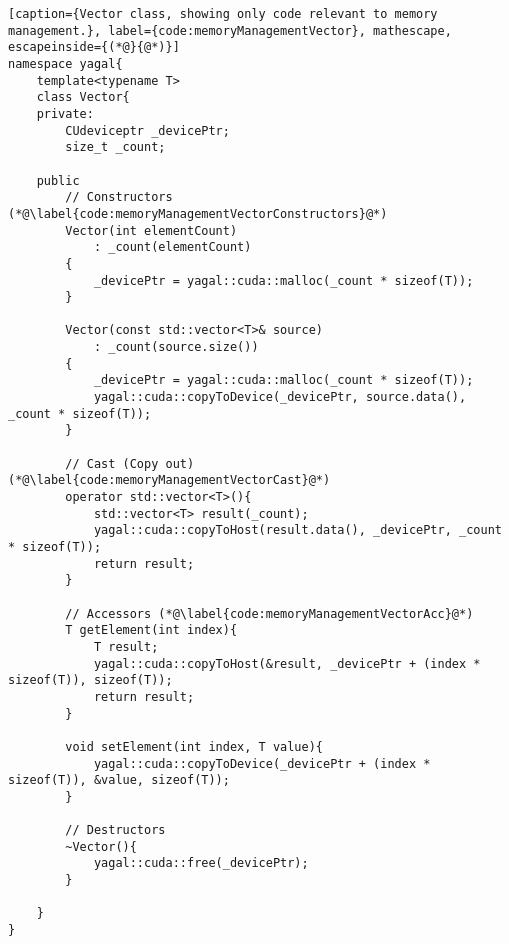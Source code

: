 

\begin{lstlisting}[caption={Vector class, showing only code relevant to memory management.}, label={code:memoryManagementVector}, mathescape, escapeinside={(*@}{@*)}]
namespace yagal{
    template<typename T>
    class Vector{
    private:
        CUdeviceptr _devicePtr;
        size_t _count;

    public
        // Constructors (*@\label{code:memoryManagementVectorConstructors}@*)
        Vector(int elementCount)
            : _count(elementCount)
        {
            _devicePtr = yagal::cuda::malloc(_count * sizeof(T));
        }

        Vector(const std::vector<T>& source)
            : _count(source.size())
        {
            _devicePtr = yagal::cuda::malloc(_count * sizeof(T));
            yagal::cuda::copyToDevice(_devicePtr, source.data(), _count * sizeof(T));
        }

        // Cast (Copy out) (*@\label{code:memoryManagementVectorCast}@*)
        operator std::vector<T>(){
            std::vector<T> result(_count);
            yagal::cuda::copyToHost(result.data(), _devicePtr, _count * sizeof(T));
            return result;
        }

        // Accessors (*@\label{code:memoryManagementVectorAcc}@*)
        T getElement(int index){
            T result;
            yagal::cuda::copyToHost(&result, _devicePtr + (index * sizeof(T)), sizeof(T));
            return result;
        }

        void setElement(int index, T value){
            yagal::cuda::copyToDevice(_devicePtr + (index * sizeof(T)), &value, sizeof(T));
        }

        // Destructors
        ~Vector(){
            yagal::cuda::free(_devicePtr);
        }

    }
}
\end{lstlisting}
